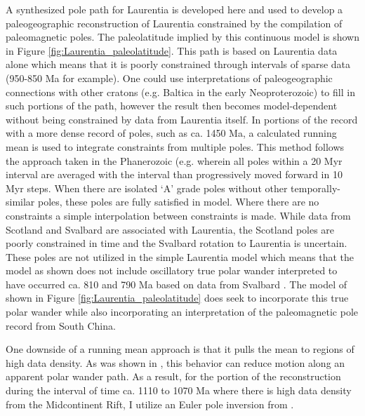 \documentclass[11pt,letterpaper]{article}
\begin{document}
A synthesized pole path for Laurentia is developed here and used to develop a paleogeographic reconstruction of Laurentia constrained by the compilation of paleomagnetic poles. The paleolatitude implied by this continuous model is shown in Figure \ref{fig:Laurentia_paleolatitude}. This path is based on Laurentia data alone which means that it is poorly constrained through intervals of sparse data (950-850 Ma for example). One could use interpretations of paleogeographic connections with other cratons (e.g. Baltica in the early Neoproterozoic) to fill in such portions of the path, however the result then becomes model-dependent without being constrained by data from Laurentia itself. In portions of the record with a more dense record of poles, such as ca. 1450 Ma, a calculated running mean is used to integrate constraints from multiple poles. This method follows the approach taken in the Phanerozoic (e.g. \citealp{Torsvik2012a} wherein all poles within a 20 Myr interval are averaged with the interval than progressively moved forward in 10 Myr steps. When there are isolated `A' grade poles without other temporally-similar poles, these poles are fully satisfied in model. Where there are no constraints a simple interpolation between constraints is made. While data from Scotland and Svalbard are associated with Laurentia, the Scotland poles are poorly constrained in time and the Svalbard rotation to Laurentia is uncertain. These poles are not utilized in the simple Laurentia model which means that the model as shown does not include oscillatory true polar wander interpreted to have occurred ca. 810 and 790 Ma based on data from Svalbard \citep{Maloof2006a}. The model of \cite{Li2013a} shown in Figure \ref{fig:Laurentia_paleolatitude} does seek to incorporate this true polar wander while also incorporating an interpretation of the paleomagnetic pole record from South China.

One downside of a running mean approach is that it pulls the mean to regions of high data density. As was shown in \cite{Swanson-Hysell2019a}, this behavior can reduce motion along an apparent polar wander path. As a result, for the portion of the reconstruction during the interval of time ca. 1110 to 1070 Ma where there is high data density from the Midcontinent Rift, I utilize an Euler pole inversion from \cite{Swanson-Hysell2019a}.
\end{document}
